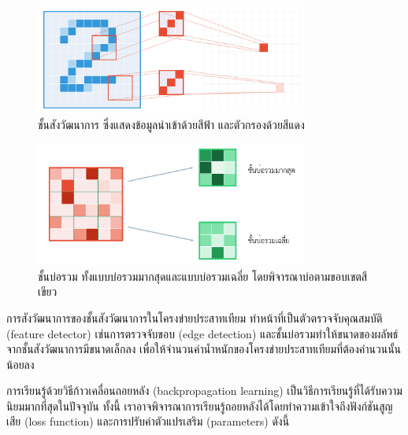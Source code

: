 \begin{figure}
    \centering
    \includegraphics[width=0.8\textwidth]{images/convolution.pdf}
    \caption{ชั้นสังวัฒนาการ ซึ่งแสดงข้อมูลนำเข้าด้วยสีฟ้า และตัวกรองด้วยสีแดง}
    \label{conv-figure}
\end{figure}
\begin{figure}
    \centering
    \includegraphics[width=0.8\textwidth]{images/pool.pdf}
    \caption{ชั้นบ่อรวม ทั้งแบบบ่อรวมมากสุดและแบบบ่อรวมเฉลี่ย โดยพิจารณาบ่อตามขอบเขตสีเขียว}
    \label{pool-figure}
\end{figure}
การสังวัฒนาการของชั้นสังวัฒนาการในโครงข่ายประสาทเทียม ทำหน้าที่เป็นตัวตรวจจับคุณสมบัติ (feature detector) เช่นการตรวจจับขอบ (edge detection) และชั้นบ่อรวมทำให้ขนาดของผลัพธ์จากชั้นสังวัฒนาการมีขนาดเล็กลง เพื่อให้จำนวนค่าน้ำหนักของโครงข่ายประสาทเทียมที่ต้องคำนวนนั้นน้อยลง

การเรียนรู้ด้วยวิธีก้าวเคลื่อนถอยหลัง (backpropagation learning) เป็นวิธีการเรียนรู้ที่ได้รับความนิยมมากที่สุดในปัจจุบัน ทั้งนี้ เราอาจพิจารณาการเรียนรู้ถอยหลังได้โดยทำความเข้าใจถึงฟังก์ชันสูญเสีย (loss function) และการปรับค่าตัวแปรเสริม (parameters) ดังนี้

